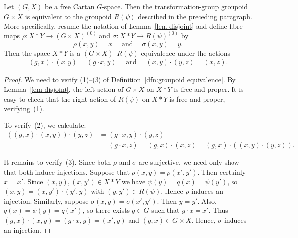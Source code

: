 \documentclass[12pt,a4paper]{amsart}
\begin{document}

\begin{thm}\label{thm-equiv} Let $(G,X)$ be a free Cartan
$G$-space. Then the transformation-group groupoid $G \times X$
is equivalent to the groupoid $R(\psi)$ described in the
preceding paragraph. More specifically, resume the notation of
Lemma~\ref{lem-disjoint} and define fibre maps $\rho : X*Y \to
(G \times X)^{(0)}$ and $\sigma : X*Y \to R(\psi)^{(0)}$ by
\[
\rho(x,y)=x\quad\text{ and }\quad \sigma(x,y) = y.
\]
Then the space $X*Y$ is a $(G\times X)$--$R(\psi)$ equivalence
under the actions
\begin{gather*}
(g,x)\cdot(x,y)=(g\cdot x, y)\quad\text{ and }\quad
(x,y)\cdot(y,z)=(x,z).
\end{gather*}
\end{thm}

\begin{proof}
We need to verify (1)--(3) of Definition~\ref{dfn:groupoid
equivalence}. By Lemma~\ref{lem-disjoint}, the left action of
$G \times X$ on $X*Y$ is free and proper.  It is easy to check
that the right action of $R(\psi)$ on $X*Y$ is free and proper,
verifying~(1).

To verify~(2), we calculate:
\[\begin{split}
\left( (g,x)\cdot(x,y) \right)\cdot (y,z)
    &=(g\cdot x,y)\cdot(y,z) \\
    &=(g\cdot x, z)=(g,x)\cdot(x,z)=(g,x)\cdot\left( (x,y) \cdot (y,z)\right).
\end{split}\]

It remains to verify~(3). Since both $\rho$ and $\sigma$ are
surjective, we need only show that both induce injections.
Suppose that $\rho(x,y)=\rho(x',y')$. Then certainly $x=x'$.
Since $(x,y),(x,y')\in X*Y$ we have $\psi(y)=q(x)=\psi(y')$, so
$(x,y)=(x, y')\cdot (y',y)$ with $(y,y')\in R(\psi)$. Hence
$\rho$ induces an injection.
Similarly, suppose $\sigma(x,y)=\sigma(x', y')$. Then $y=y'$.
Also, $q(x)=\psi(y)=q(x')$, so there exists $g\in G$ such that
$g\cdot x=x'$.  Thus $(g,x)\cdot(x,y)=(g\cdot x, y)=(x',y)$ and
$(g,x)\in G\times X$.  Hence, $\sigma$ induces an injection.
\end{proof}
\end{document}
